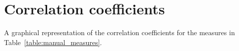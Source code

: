 
\section{Correlation coefficients}\label{app:correlations}

A graphical representation of the correlation coefficients for the measures in
Table~\ref{table:manual_measures}.

